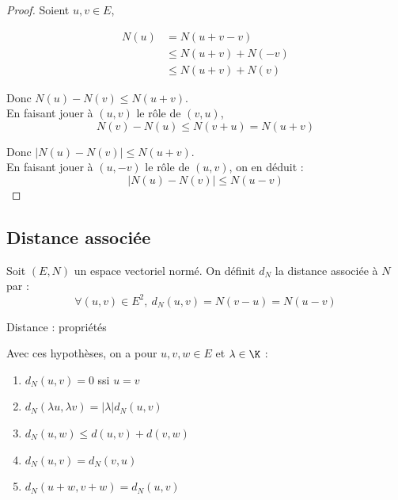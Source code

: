 
\begin{proof}
    Soient $u, v \in E$,

    \begin{align*}
    N(u) &= N(u + v - v) \\
         &\leqslant N(u + v) + N(-v) \\
         &\leqslant N(u + v) + N(v)
    \end{align*}

    Donc $N(u) - N(v) \leqslant N(u + v)$. \\

    En faisant jouer à $(u, v)$ le rôle de $(v, u)$, 
    \[N(v) - N(u) \leqslant N(v + u) = N(u + v)\]

    Donc $|N(u) - N(v)| \leqslant N(u + v)$. \\

    En faisant jouer à $(u, -v)$ le rôle de $(u, v)$, on en déduit : 
    \[|N(u) - N(v)| \leqslant N(u - v)\]
\end{proof}

\subsection{Distance associée}

\begin{definition}{}{}
    Soit $(E, N)$ un espace vectoriel normé.
    On définit $d_N$ la distance associée à $N$ par :
    \[\forall (u, v) \in E^2,~ d_N(u, v) = N(v - u) = N(u - v)\]
\end{definition}

\begin{proposition}{Distance : propriétés}{}

    Avec ces hypothèses, on a pour $u, v, w \in E$ et $\lambda \in \K$ :

    \begin{enumerate}
        \item $d_N(u, v) = 0$ ssi $u = v$
        \item $d_N(\lambda u, \lambda v) = |\lambda| d_N(u, v)$
        \item $d_N(u, w) \leqslant d(u, v) + d(v, w)$
        \item $d_N (u, v) = d_N (v, u)$
        \item $d_N (u + w, v + w) = d_N (u, v)$
    \end{enumerate}
\end{proposition}

